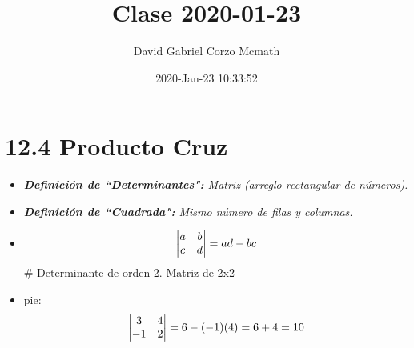 \documentclass{article}
\title{Clase 2020-01-23}
\author{David Gabriel Corzo Mcmath}
\date{2020-Jan-23 10:33:52}
\begin{document}
\maketitle


\section{12.4 Producto Cruz}
\begin{itemize}
    \item \emph{\textbf{Definición de ``Determinantes":} Matriz (arreglo rectangular de números).}
    \item \emph{\textbf{Definición de ``Cuadrada":} Mismo número de filas y columnas. }
    \item \begin{equation*}
        \begin{vmatrix}
            a & b \\ 
            c & d \\ 
        \end{vmatrix}
        = ad - bc \\ 
    \end{equation*}
    \# Determinante de orden 2. Matriz de 2x2 
    
    \item pie:
        \begin{equation*}
            \begin{vmatrix}
                3 & 4 \\ 
                -1 & 2 \\ 
            \end{vmatrix}
            = 6 - (-1) (4) = 6 + 4 = 10 \\ 
        \end{equation*}
    

\end{itemize}
\end{document}
